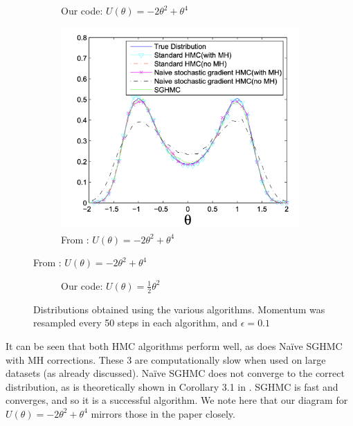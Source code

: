\begin{figure}[h!]

\begin{subfigure}{0.45\textwidth}

\caption{Our code: $U(\theta) = -2\theta^2 + \theta^4$}
\label{fig1a}
\end{subfigure}%

\begin{subfigure}{0.45\textwidth}
\includegraphics[width=\linewidth]{parts/Images/reproduce2.png}
\caption{From \cite{sghmc}: $U(\theta) = -2\theta^2 + \theta^4$}
\end{subfigure}%

\end{figure}
\begin{figure}

\begin{subfigure}{\textwidth}

\caption{Our code: $U(\theta) = \frac{1}{2}\theta^2$}
\label{fig1b}
\end{subfigure}
\caption{Distributions obtained using the various algorithms. Momentum was resampled every 50 steps in each algorithm, and $\epsilon=0.1$}
\label{fig:demo}
\end{figure}

It can be seen that both HMC algorithms perform well, as does Naïve SGHMC with MH corrections. These 3 are computationally slow when used on large datasets (as already discussed). Naïve SGHMC does not converge to the correct distribution, as is theoretically shown in Corollary 3.1 in \cite{sghmc}. SGHMC is fast and converges, and so it is a successful algorithm. We note here that our diagram for $U(\theta) = -2\theta^2 + \theta^4$ mirrors those in the paper closely.

